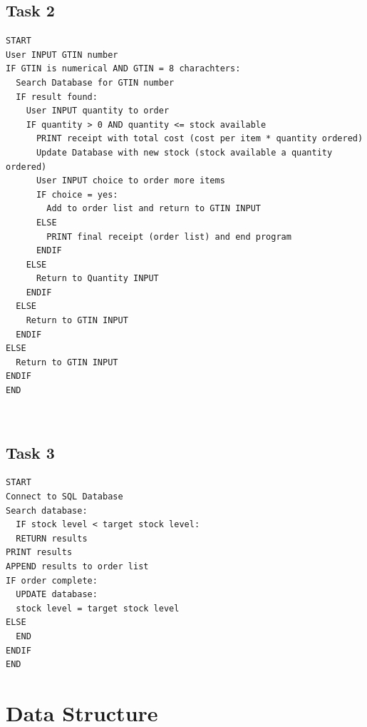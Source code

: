 \documentclass[a4paper]{article}
\begin{document}
\subsection{Task 2}
\begin{lstlisting}
START
User INPUT GTIN number
IF GTIN is numerical AND GTIN = 8 charachters:
  Search Database for GTIN number
  IF result found:
    User INPUT quantity to order
    IF quantity > 0 AND quantity <= stock available
      PRINT receipt with total cost (cost per item * quantity ordered)
      Update Database with new stock (stock available a quantity ordered)
      User INPUT choice to order more items
      IF choice = yes:
        Add to order list and return to GTIN INPUT
      ELSE
        PRINT final receipt (order list) and end program
      ENDIF
    ELSE
      Return to Quantity INPUT
    ENDIF
  ELSE
    Return to GTIN INPUT
  ENDIF
ELSE
  Return to GTIN INPUT	
ENDIF
END
\end{lstlisting}
\

\subsection{Task 3}
\begin{lstlisting}
START
Connect to SQL Database
Search database:
  IF stock level < target stock level:
  RETURN results
PRINT results
APPEND results to order list
IF order complete:
  UPDATE database:
  stock level = target stock level
ELSE
  END
ENDIF
END
\end{lstlisting}

\pagebreak


\section{Data Structure}
\end{document}
